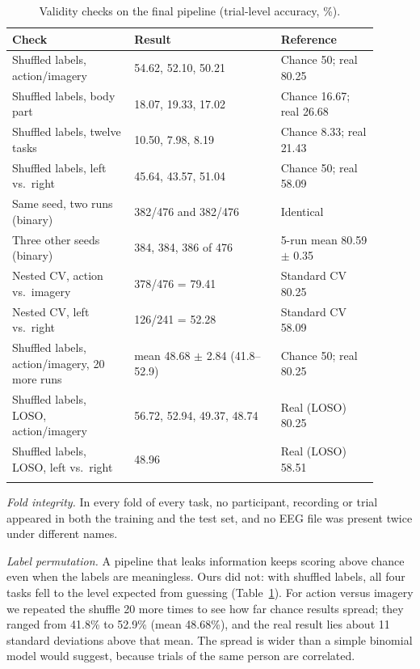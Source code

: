\documentclass[pdflatex,sn-mathphys-num]{sn-jnl}%
\theoremstyle{thmstyleone}%
\theoremstyle{thmstyletwo}%
\theoremstyle{thmstylethree}%
\begin{document}
\begin{table}[htbp]
\centering
\caption{Validity checks on the final pipeline (trial-level accuracy, \%).}
\label{tab:validity}
\footnotesize
\begin{tabular}{@{}p{0.30\linewidth}p{0.36\linewidth}p{0.24\linewidth}@{}}
\toprule
Check & Result & Reference \\
\midrule
Shuffled labels, action/imagery & 54.62, 52.10, 50.21 & Chance 50; real 80.25 \\
Shuffled labels, body part & 18.07, 19.33, 17.02 & Chance 16.67; real 26.68 \\
Shuffled labels, twelve tasks & 10.50, 7.98, 8.19 & Chance 8.33; real 21.43 \\
Shuffled labels, left vs.\ right & 45.64, 43.57, 51.04 & Chance 50; real 58.09 \\
\addlinespace
Same seed, two runs (binary) & 382/476 and 382/476 & Identical \\
Three other seeds (binary) & 384, 384, 386 of 476 & 5-run mean 80.59 $\pm$ 0.35 \\
\addlinespace
Nested CV, action vs.\ imagery & 378/476 = 79.41 & Standard CV 80.25 \\
Nested CV, left vs.\ right & 126/241 = 52.28 & Standard CV 58.09 \\
\addlinespace
Shuffled labels, action/imagery, 20 more runs & mean 48.68 $\pm$ 2.84 (41.8--52.9) & Chance 50; real 80.25 \\
Shuffled labels, LOSO, action/imagery & 56.72, 52.94, 49.37, 48.74 & Real (LOSO) 80.25 \\
Shuffled labels, LOSO, left vs.\ right & 48.96 & Real (LOSO) 58.51 \\
\botrule
\end{tabular}
\end{table}

\emph{Fold integrity.} In every fold of every task, no participant, recording or trial appeared in both the training and the test set, and no EEG file was present twice under different names.

\emph{Label permutation.} A pipeline that leaks information keeps scoring above chance even when the labels are meaningless. Ours did not: with shuffled labels, all four tasks fell to the level expected from guessing (Table~\ref{tab:validity}). For action versus imagery we repeated the shuffle 20 more times to see how far chance results spread; they ranged from 41.8\% to 52.9\% (mean 48.68\%), and the real result lies about 11 standard deviations above that mean. The spread is wider than a simple binomial model would suggest, because trials of the same person are correlated.
\end{document}
